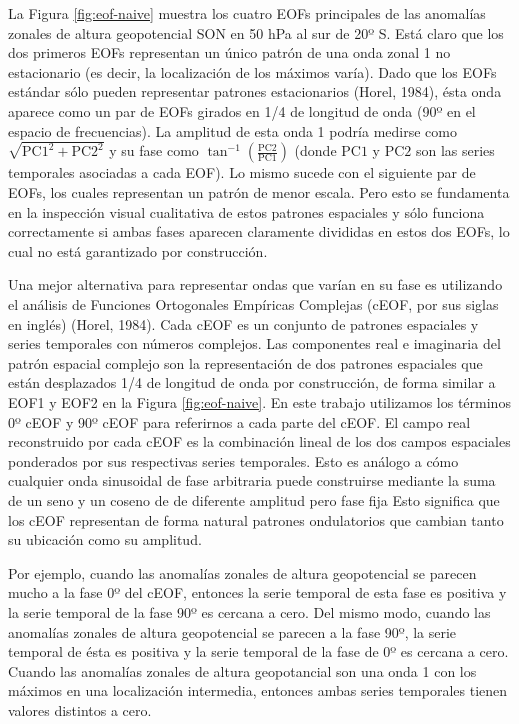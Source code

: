\documentclass[12pt,oneside]{reedthesis}
\begin{document}
La Figura \ref{fig:eof-naive} muestra los cuatro EOFs principales de las anomalías zonales de altura geopotencial SON en 50 hPa al sur de 20º S.
Está claro que los dos primeros EOFs representan un único patrón de una onda zonal 1 no estacionario (es decir, la localización de los máximos varía).
Dado que los EOFs estándar sólo pueden representar patrones estacionarios (Horel, 1984), ésta onda aparece como un par de EOFs girados en 1/4 de longitud de onda (90º en el espacio de frecuencias).
La amplitud de esta onda 1 podría medirse como \(\sqrt{\mathrm{PC1}^2 + \mathrm{PC2}^2}\) y su fase como \(\tan^{-1} \left ( \frac{\mathrm{PC2}}{\mathrm{PC1}} \right )\) (donde \(\mathrm{PC1}\) y \(\mathrm{PC2}\) son las series temporales asociadas a cada EOF).
Lo mismo sucede con el siguiente par de EOFs, los cuales representan un patrón de menor escala.
Pero esto se fundamenta en la inspección visual cualitativa de estos patrones espaciales y sólo funciona correctamente si ambas fases aparecen claramente divididas en estos dos EOFs, lo cual no está garantizado por construcción.

Una mejor alternativa para representar ondas que varían en su fase es utilizando el análisis de Funciones Ortogonales Empíricas Complejas (cEOF, por sus siglas en inglés) (Horel, 1984).
Cada cEOF es un conjunto de patrones espaciales y series temporales con números complejos.
Las componentes real e imaginaria del patrón espacial complejo son la representación de dos patrones espaciales que están desplazados 1/4 de longitud de onda por construcción, de forma similar a EOF1 y EOF2 en la Figura \ref{fig:eof-naive}.
En este trabajo utilizamos los términos 0º cEOF y 90º cEOF para referirnos a cada parte del cEOF.
El campo real reconstruido por cada cEOF es la combinación lineal de los dos campos espaciales ponderados por sus respectivas series temporales.
Esto es análogo a cómo cualquier onda sinusoidal de fase arbitraria puede construirse mediante la suma de un seno y un coseno de de diferente amplitud pero fase fija
Esto significa que los cEOF representan de forma natural patrones ondulatorios que cambian tanto su ubicación como su amplitud.

Por ejemplo, cuando las anomalías zonales de altura geopotencial se parecen mucho a la fase 0º del cEOF, entonces la serie temporal de esta fase es positiva y la serie temporal de la fase 90º es cercana a cero.
Del mismo modo, cuando las anomalías zonales de altura geopotencial se parecen a la fase 90º, la serie temporal de ésta es positiva y la serie temporal de la fase de 0º es cercana a cero.
Cuando las anomalías zonales de altura geopotancial son una onda 1 con los máximos en una localización intermedia, entonces ambas series temporales tienen valores distintos a cero.
\end{document}

